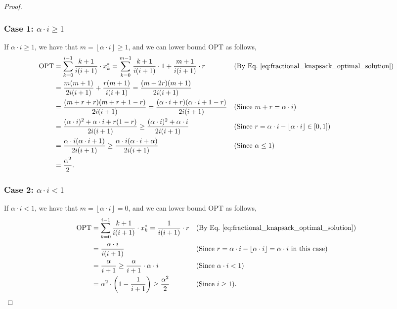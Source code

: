 \documentclass[11pt]{article}
\newcommand{\floor}[1]{\left\lfloor #1 \right\rfloor}
\begin{document}
\begin{proof}
\subsubsection*{Case 1: $\alpha\cdot i\ge 1$}
If $\alpha\cdot i\ge 1$, we have that $m=\floor{\alpha\cdot i}\ge 1$, and we can lower bound $\textrm{OPT}$ as follows,
\begin{align*}
    \textrm{OPT}&=\sum_{k=0}^{i-1}\frac{k+1}{i(i+1)}\cdot x^*_k=\sum_{k=0}^{m-1}\frac{k+1}{i(i+1)}\cdot 1 + \frac{m+1}{i(i+1)}\cdot r &&\text{(By Eq.~\eqref{eq:fractional_knapsack_optimal_solution})}\\
    &=\frac{m(m+1)}{2i(i+1)} + \frac{r(m+1)}{i(i+1)}=\frac{(m+2r)(m+1)}{2i(i+1)}\\
    &=\frac{(m+r+r)(m+r+1-r)}{2i(i+1)}=\frac{(\alpha\cdot i +r)(\alpha\cdot i+1-r)}{2i(i+1)} &&\textrm{(Since $m+r=\alpha\cdot i$)}\\
    &=\frac{(\alpha\cdot i)^2+\alpha\cdot i+r(1-r)}{2i(i+1)}\ge\frac{(\alpha\cdot i)^2+\alpha\cdot i}{2i(i+1)} &&\text{(Since $r=\alpha\cdot i-\floor{\alpha\cdot i}\in[0,1]$)}\\
    &=\frac{\alpha\cdot i(\alpha\cdot i +1)}{2i(i+1)}\ge\frac{\alpha\cdot i(\alpha\cdot i +\alpha)}{2i(i+1)} &&\text{(Since $\alpha\le1$)}\\
    &=\frac{\alpha^2}{2}.
\end{align*}
\subsubsection*{Case 2: $\alpha\cdot i< 1$}
If $\alpha\cdot i< 1$, we have that $m=\floor{\alpha\cdot i}=0$, and we can lower bound $\textrm{OPT}$ as follows,
\begin{align*}
    \textrm{OPT}&=\sum_{k=0}^{i-1}\frac{k+1}{i(i+1)}\cdot x^*_k=\frac{1}{i(i+1)}\cdot r &&\text{(By Eq.~\eqref{eq:fractional_knapsack_optimal_solution})}\\
    &=\frac{\alpha\cdot i}{i(i+1)} &&\text{(Since $r=\alpha\cdot i-\floor{\alpha\cdot i}=\alpha\cdot i$ in this case)}\\
    &=\frac{\alpha}{i+1}\ge\frac{\alpha}{i+1}\cdot\alpha\cdot i &&\text{(Since $\alpha\cdot i<1$)}\\
    &=\alpha^2\cdot\left(1-\frac{1}{i+1}\right)\ge\frac{\alpha^2}{2} &&\text{(Since $i\ge 1$)}.
\end{align*}
\end{proof}
\end{document}
